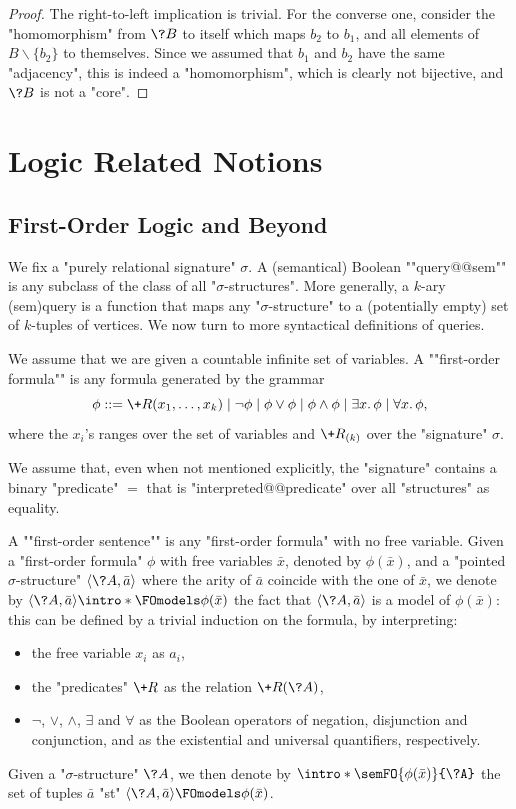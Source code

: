 \begin{proof}
	The right-to-left implication is trivial.
	For the converse one, consider the "homomorphism" from $\?B$ to itself
	which maps $b_2$ to $b_1$, and all elements of $B \smallsetminus \{b_2\}$
	to themselves. Since we assumed that $b_1$ and $b_2$ have the same "adjacency",
	this is indeed a "homomorphism", which is clearly not bijective, and
	$\?B$ is not a "core".
\end{proof}

\section{Logic Related Notions}

\subsection{First-Order Logic and Beyond}
\label{sec:prelim-fo}

We fix a "purely relational signature" $\sigma$.
A (semantical) Boolean \AP""query@@sem"" is any subclass of the
class of all "$\sigma$-structures".
More generally, a $k$-ary \reintro(sem){query} is a function
that maps any "$\sigma$-structure" to a (potentially empty) set of $k$-tuples
of vertices.
We now turn to more syntactical definitions of queries.

We assume that we are given a countable infinite set of variables.
A \AP""first-order formula"" is any formula generated by the grammar 
\[
	\phi \mathrel{{:}{:}{=}} \+R(x_1,\dotsc,x_k) \mid \neg \phi \mid \phi \lor \phi \mid \phi \land \phi
	\mid \exists x.\, \phi \mid \forall x.\, \phi,
\]
where the $x_i$'s ranges over the set of variables and $\+R_{(k)}$ over the "signature" $\sigma$.

\begin{hypothesis}
We assume that, even when not mentioned explicitly, the "signature" contains
a binary "predicate" $=$ that is "interpreted@@predicate" over all "structures"
as equality.
\end{hypothesis}

A \AP""first-order sentence"" is any "first-order formula" with no free variable.
Given a "first-order formula" $\phi$ with free variables $\bar x$, denoted by $\phi(\bar x)$,
and a "pointed $\sigma$-structure" $\tup{\?A,\bar a}$ where the arity of $\bar a$ coincide with
the one of $\bar x$, we denote by $\tup{\?A,\bar a} \intro*\FOmodels \phi(\bar x)$
the fact that $\tup{\?A,\bar a}$ is a model of $\phi(\bar x)$: this can be defined by
a trivial induction on the formula, by interpreting:
\begin{itemize}
	\item the free variable $x_i$ as $a_i$,
	\item the "predicates" $\+R$ as the relation $\+R(\?A)$,
	\item $\neg$, $\lor$, $\land$, $\exists$ and $\forall$ as the Boolean operators of negation, disjunction and conjunction, and as the existential and universal quantifiers, respectively.
\end{itemize}
Given a "$\sigma$-structure" $\?A$, we then denote by \AP$\intro*\semFO{\phi(\bar x)}{\?A}$
the set of tuples $\bar a$ "st" $\tup{\?A, \bar a} \FOmodels \phi(\bar x)$.

